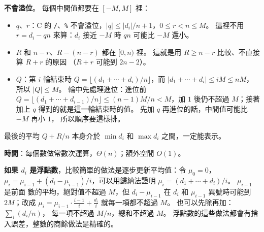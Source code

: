 \begin{pastsoln}
\textbf{不會溢位}。 每個中間值都要在 $[-M, M]$ 裡：
\begin{itemize}
\item $q$、$r$：C 的 \texttt{/}、\texttt{\%} 不會溢位，$|q| \le |d_i|/n + 1$，$0 \le r < n \le M$。 這裡不用
$r = d_i - q n$ 來算：$d_i$ 接近 $-M$ 時 $qn$ 可能比 $-M$ 還小。
\item $R$ 和 $n - r$、$R - (n - r)$ 都在 $[0, n)$ 裡。 這就是用 $R \ge n - r$ 比較、不直接算 $R + r$ 的原因
（$R + r$ 可能到 $2n - 2$）。
\item $Q$：第 $i$ 輪結束時 $Q = \lfloor (d_1 + \cdots + d_i)/n \rfloor$，而 $|d_1 + \cdots + d_i| \le iM \le nM$，
所以 $|Q| \le M$。 輪中先處理進位：進位前 $Q = \lfloor (d_1 + \cdots + d_{i-1})/n \rfloor \le (n-1)M/n < M$，加 $1$
後仍不超過 $M$；接著加上 $q$ 得到的就是這一輪結束時的值。 先加 $q$ 再進位的話，中間值可能比 $-M$ 再小 $1$，
所以順序要這樣排。
\end{itemize}
最後的平均 $Q + R/n$ 本身介於 $\min d_i$ 和 $\max d_i$ 之間，一定能表示。

\textbf{時間}：每個數做常數次運算，$\Theta(n)$；額外空間 $O(1)$。

\textbf{如果 $d_i$ 是浮點數}，比較簡單的做法是逐步更新平均值：令 $\mu_0 = 0$，
$\mu_i = \mu_{i-1} + (d_i - \mu_{i-1})/i$，可以用歸納法證明 $\mu_i = (d_1 + \cdots + d_i)/i$。 $\mu_{i-1}$ 是前面
數的平均，絕對值不超過 $M$，但 $d_i - \mu_{i-1}$ 在 $d_i$ 和 $\mu_{i-1}$ 異號時可能到 $2M$；改成
$\mu_i = \mu_{i-1} \cdot \frac{i-1}{i} + \frac{d_i}{i}$ 就每一項都不超過 $M$。 也可以先除再加：$\sum_i (d_i / n)$，
每一項不超過 $M/n$，總和不超過 $M$。 浮點數的這些做法都會有捨入誤差，整數的商餘做法是精確的。
\end{pastsoln}
